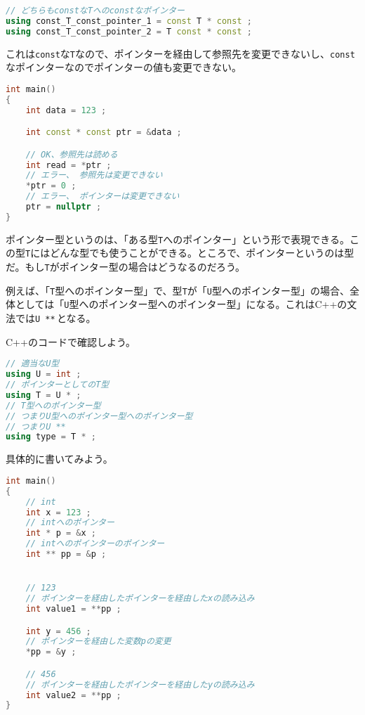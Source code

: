 \begin{lstlisting}[language={C++}]
// どちらもconstなTへのconstなポインター
using const_T_const_pointer_1 = const T * const ;
using const_T_const_pointer_2 = T const * const ;
\end{lstlisting}

これは\texttt{const}な\texttt{T}なので、ポインターを経由して参照先を変更できないし、\texttt{const}なポインターなのでポインターの値も変更できない。

\begin{lstlisting}[language={C++}]
int main()
{
    int data = 123 ;

    int const * const ptr = &data ;

    // OK、参照先は読める
    int read = *ptr ;
    // エラー、 参照先は変更できない
    *ptr = 0 ;
    // エラー、 ポインターは変更できない
    ptr = nullptr ;
}
\end{lstlisting}


ポインター型というのは、「ある型\texttt{T}へのポインター」という形で表現できる。この型\texttt{T}にはどんな型でも使うことができる。ところで、ポインターというのは型だ。もし\texttt{T}がポインター型の場合はどうなるのだろう。

例えば、「\texttt{T}型へのポインター型」で、型\texttt{T}が「\texttt{U}型へのポインター型」の場合、全体としては「\texttt{U}型へのポインター型へのポインター型」になる。これはC++の文法では\texttt{U **}\,となる。

C++のコードで確認しよう。

\ifTombow\enlargethispage{3mm}\fi
\begin{lstlisting}[language={C++}]
// 適当なU型
using U = int ;
// ポインターとしてのT型
using T = U * ;
// T型へのポインター型
// つまりU型へのポインター型へのポインター型
// つまりU **
using type = T * ;
\end{lstlisting}

具体的に書いてみよう。

\begin{lstlisting}[language={C++}]
int main()
{
    // int
    int x = 123 ;
    // intへのポインター
    int * p = &x ;
    // intへのポインターのポインター
    int ** pp = &p ;


    // 123
    // ポインターを経由したポインターを経由したxの読み込み
    int value1 = **pp ; 

    int y = 456 ;
    // ポインターを経由した変数pの変更
    *pp = &y ;

    // 456
    // ポインターを経由したポインターを経由したyの読み込み
    int value2 = **pp ;
}
\end{lstlisting}

